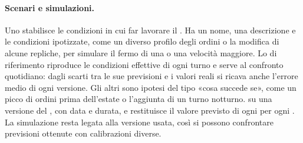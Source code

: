 \paragraph{Scenari e simulazioni.}
Uno  stabilisce le condizioni in cui far lavorare il . Ha
un nome, una descrizione e le condizioni ipotizzate, come un diverso profilo degli ordini o la modifica
di alcune repliche, per simulare il fermo di una  o una velocità maggiore. Lo
 di riferimento riproduce le condizioni effettive di ogni turno e serve al confronto
quotidiano: dagli scarti tra le sue previsioni e i valori reali si ricava anche l'errore medio di ogni
versione. Gli altri  sono ipotesi del tipo «cosa succede se», come un picco di ordini
prima dell'estate o l'aggiunta di un turno notturno.  su una versione del , con data e durata,
e restituisce il valore previsto di ogni  per ogni . La
simulazione resta legata alla versione usata, così si possono confrontare previsioni ottenute con
calibrazioni diverse.
